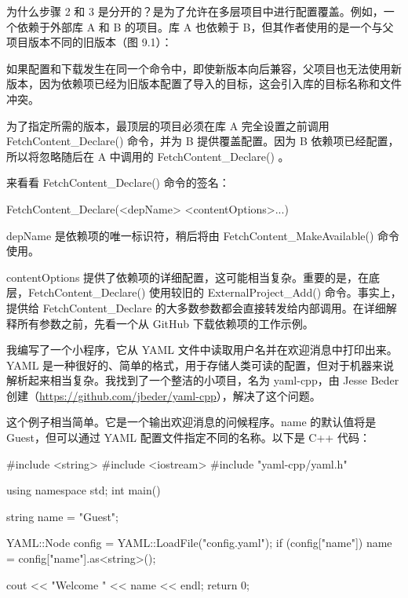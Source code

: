 为什么步骤 2 和 3 是分开的？是为了允许在多层项目中进行配置覆盖。例如，一个依赖于外部库 A 和 B 的项目。库 A 也依赖于 B，但其作者使用的是一个与父项目版本不同的旧版本（图 9.1）：


如果配置和下载发生在同一个命令中，即使新版本向后兼容，父项目也无法使用新版本，因为依赖项已经为旧版本配置了导入的目标，这会引入库的目标名称和文件冲突。

为了指定所需的版本，最顶层的项目必须在库 A 完全设置之前调用 FetchContent\_Declare() 命令，并为 B 提供覆盖配置。因为 B 依赖项已经配置，所以将忽略随后在 A 中调用的 FetchContent\_Declare() 。

来看看 FetchContent\_Declare() 命令的签名：

\begin{shell}
FetchContent_Declare(<depName> <contentOptions>...)
\end{shell}

depName 是依赖项的唯一标识符，稍后将由 FetchContent\_MakeAvailable() 命令使用。

contentOptions 提供了依赖项的详细配置，这可能相当复杂。重要的是，在底层，FetchContent\_Declare() 使用较旧的 ExternalProject\_Add() 命令。事实上，提供给 FetchContent\_Declare 的大多数参数都会直接转发给内部调用。在详细解释所有参数之前，先看一个从 GitHub 下载依赖项的工作示例。


我编写了一个小程序，它从 YAML 文件中读取用户名并在欢迎消息中打印出来。YAML 是一种很好的、简单的格式，用于存储人类可读的配置，但对于机器来说解析起来相当复杂。我找到了一个整洁的小项目，名为 yaml-cpp，由 Jesse Beder 创建（\url{https://github.com/jbeder/yaml-cpp}），解决了这个问题。

这个例子相当简单。它是一个输出欢迎消息的问候程序。name 的默认值将是 Guest，但可以通过 YAML 配置文件指定不同的名称。以下是 C++ 代码：


\begin{cpp}
#include <string>
#include <iostream>
#include "yaml-cpp/yaml.h"

using namespace std;
int main() {
    string name = "Guest";

    YAML::Node config = YAML::LoadFile("config.yaml");
    if (config["name"])
        name = config["name"].as<string>();

    cout << "Welcome " << name << endl;
    return 0;
}
\end{cpp}

